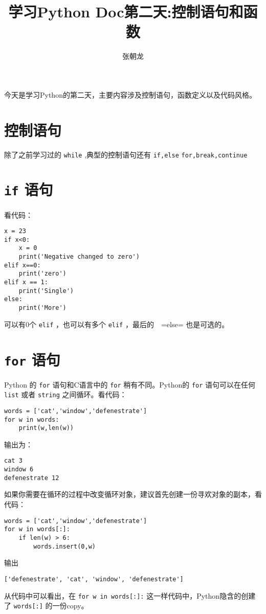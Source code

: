 \documentclass[10pt,a4paper,UTF8]{article}
\author{张朝龙}
\date{}
\title{学习Python Doc第二天:控制语句和函数}
\begin{document}
\maketitle
\tableofcontents

今天是学习Python的第二天，主要内容涉及控制语句，函数定义以及代码风格。


\section{控制语句}
\label{sec:org50c70ff}


除了之前学习过的 \texttt{while} ,典型的控制语句还有 \texttt{if,else} \texttt{for,break,continue} 

\section{\texttt{if} 语句}
\label{sec:orgb442611}

看代码：
\lstset{language=Python,label= ,caption= ,captionpos=b,numbers=none}
\begin{lstlisting}
x = 23
if x<0:
    x = 0
    print('Negative changed to zero')
elif x==0:
    print('zero')
elif x == 1:
    print('Single')
else:
    print('More')
\end{lstlisting}
可以有0个 \texttt{elif} ，也可以有多个 \texttt{elif} ，最后的　=else= 也是可选的。
\section{\texttt{for} 语句}
\label{sec:org1e52e1f}


Python 的 \texttt{for} 语句和C语言中的 \texttt{for} 稍有不同。Python的 \texttt{for} 语句可以在任何 \texttt{list} 或者 \texttt{string} 之间循环。看代码：

\lstset{language=Python,label= ,caption= ,captionpos=b,numbers=none}
\begin{lstlisting}
words = ['cat','window','defenestrate']
for w in words:
    print(w,len(w))
\end{lstlisting}
输出为：
\begin{verbatim}
cat 3
window 6
defenestrate 12
\end{verbatim}

如果你需要在循环的过程中改变循环对象，建议首先创建一份寻欢对象的副本，看代码：
\lstset{language=Python,label= ,caption= ,captionpos=b,numbers=none}
\begin{lstlisting}
words = ['cat','window','defenestrate']
for w in words[:]:
    if len(w) > 6:
        words.insert(0,w)
\end{lstlisting}
输出
\begin{verbatim}
['defenestrate', 'cat', 'window', 'defenestrate']
\end{verbatim}
从代码中可以看出，在 \texttt{for w in words[:]:} 这一样代码中，Python隐含的创建了 \texttt{words[:]} 的一份copy。
\end{document}
